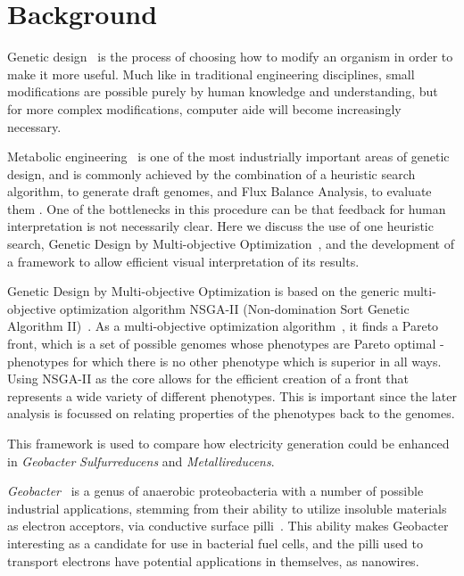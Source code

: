 \documentclass[a4paper,twocolumn]{article}
\begin{document}
\section{Background}

Genetic design~\cite{} is the process of choosing how to modify an organism in order to make it more useful. Much like in traditional engineering disciplines, small modifications are possible purely by human knowledge and understanding, but for more complex modifications, computer aide will become increasingly necessary.

Metabolic engineering~\cite{} is one of the most industrially important areas of genetic design, and is commonly achieved by the combination of a heuristic search algorithm, to generate draft genomes, and Flux Balance Analysis, to evaluate them \cite{}. One of the bottlenecks in this procedure can be that feedback for human interpretation is not necessarily clear. Here we discuss the use of one heuristic search, Genetic Design by Multi-objective Optimization~\cite{Costanza2012}, and the development of a framework to allow efficient visual interpretation of its results.

Genetic Design by Multi-objective Optimization is based on the generic multi-objective optimization algorithm NSGA-II (Non-domination Sort Genetic Algorithm II)~\cite{Deb2002a}. As a multi-objective optimization  algorithm~\cite{Gen2008}, it finds a Pareto front, which is a set of possible genomes whose phenotypes are Pareto optimal - phenotypes for which there is no other phenotype which is superior in all ways. Using NSGA-II as the core allows for the efficient creation of a front that represents a wide variety of different phenotypes. This is important since the later analysis is focussed on relating properties of the phenotypes back to the genomes.

This framework is used to compare how electricity generation could be enhanced in {\it Geobacter} {\it Sulfurreducens} and {\it Metallireducens}.

{\it Geobacter}~\cite{Lovley2011} is a genus of anaerobic proteobacteria with a number of possible industrial applications, stemming from their ability to utilize insoluble materials as electron acceptors, via conductive surface pilli~\cite{Bond2003}. This ability makes Geobacter interesting as a candidate for use in bacterial fuel cells, and the pilli used to transport electrons have potential applications in themselves, as nanowires.
\end{document}
